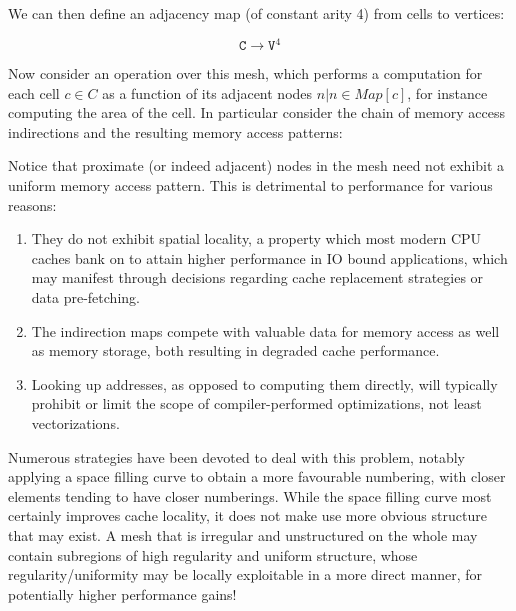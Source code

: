 We can then define an adjacency map (of constant arity 4) from cells to vertices:

$$\texttt{C} \rightarrow \texttt{V}^4$$

Now consider an operation over this mesh, which performs a computation for each cell $c \in C$ as a function of its adjacent nodes ${n | n \in Map[c]}$, for instance computing the area of the cell. In particular consider the chain of memory access indirections and the resulting memory access patterns:

%

Notice that proximate (or indeed adjacent) nodes in the mesh need not exhibit a uniform memory access pattern. This is detrimental to performance for various reasons:
\begin{enumerate}
\item They do not exhibit spatial locality, a property which most modern CPU caches bank on to attain higher performance in IO bound applications, which may manifest through decisions regarding cache replacement strategies or data pre-fetching.
\item The indirection maps compete with valuable data for memory access as well as memory storage, both resulting in degraded cache performance.
\item Looking up addresses, as opposed to computing them directly, will typically prohibit or limit the scope of compiler-performed optimizations, not least vectorizations.
\end{enumerate}

Numerous strategies have been devoted to deal with this problem, notably applying a space filling curve to obtain a more favourable numbering, with closer elements tending to have closer numberings. While the space filling curve most certainly improves cache locality, it does not make use more obvious structure that may exist. A mesh that is irregular and unstructured on the whole may contain subregions of high regularity and uniform structure, whose regularity/uniformity may be locally exploitable in a more direct manner, for potentially higher performance gains!


